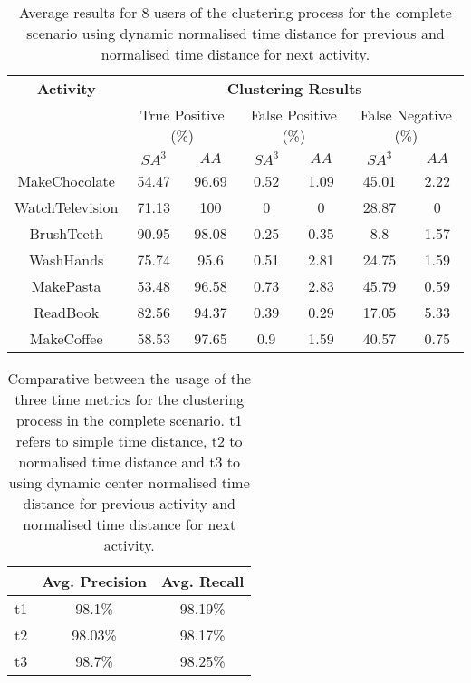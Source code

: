 \begin{table}[htbp]\scriptsize
  \begin{center}
        \begin{tabular}{ccccccc}
            \hline            
            \textbf{Activity} & \multicolumn{6}{c}{\textbf{Clustering Results}} \\
             & \multicolumn{2}{c}{True Positive (\%)} & \multicolumn{2}{c}{False Positive (\%)} & \multicolumn{2}{c}{False Negative (\%)} \\
             & $SA^3$ & $AA$ & $SA^3$ & $AA$ & $SA^3$ & $AA$ \\
            \hline
            MakeChocolate   & 54.47 & 96.69 & 0.52 & 1.09 & 45.01 & 2.22 \\
	    WatchTelevision & 71.13 & 100   & 0    & 0    & 28.87 & 0    \\
	    BrushTeeth      & 90.95 & 98.08 & 0.25 & 0.35 & 8.8   & 1.57 \\
	    WashHands       & 75.74 & 95.6  & 0.51 & 2.81 & 24.75 & 1.59 \\
	    MakePasta       & 53.48 & 96.58 & 0.73 & 2.83 & 45.79 & 0.59 \\
	    ReadBook        & 82.56 & 94.37 & 0.39 & 0.29 & 17.05 & 5.33 \\
	    MakeCoffee      & 58.53 & 97.65 & 0.9  & 1.59 & 40.57 & 0.75 \\
            \hline
        \end{tabular}
        \caption{Average results for 8 users of the clustering process for the complete scenario using dynamic normalised time distance for previous and normalised time distance for next activity.}
        \label{tab-r-comp-t3}
   \end{center}
\end{table}

\begin{table}[htbp]\scriptsize
\begin{center}
 \begin{tabular}{ccc}
  \hline
   & Avg. Precision & Avg. Recall \\
  \hline
  t1 & 98.1\%  & 98.19\% \\
  t2 & 98.03\% & 98.17\% \\
  t3 & 98.7\%  & 98.25\% \\
  \hline
 \end{tabular}
 \caption{Comparative between the usage of the three time metrics for the clustering process in the complete scenario. t1 refers to simple time distance, t2 to normalised time distance and t3 to using dynamic center normalised time distance for previous activity and normalised time distance for next activity.}
 \label{tab-r-comparative-complete}
\end{center} 
\end{table}

